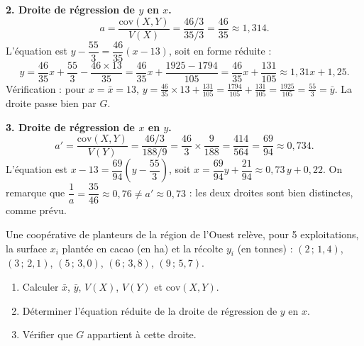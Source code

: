 \documentclass[11pt]{article}
\begin{document}
\begin{exoresolu}
\textbf{2. Droite de régression de $y$ en $x$.}
\[
a=\frac{\mathrm{cov}(X,Y)}{V(X)}=\frac{46/3}{35/3}=\frac{46}{35}\approx 1{,}314.
\]
L'équation est $y-\dfrac{55}{3}=\dfrac{46}{35}(x-13)$, soit en forme réduite :
\[
y=\frac{46}{35}x+\frac{55}{3}-\frac{46\times 13}{35}=\frac{46}{35}x+\frac{1925-1794}{105}=\frac{46}{35}x+\frac{131}{105}\approx 1{,}31x+1{,}25.
\]
Vérification : pour $x=\bar{x}=13$, $y=\frac{46}{35}\times 13+\frac{131}{105}=\frac{1794}{105}+\frac{131}{105}=\frac{1925}{105}=\frac{55}{3}=\bar{y}$. La droite passe bien par $G$.

\textbf{3. Droite de régression de $x$ en $y$.}
\[
a'=\frac{\mathrm{cov}(X,Y)}{V(Y)}=\frac{46/3}{188/9}=\frac{46}{3}\times\frac{9}{188}=\frac{414}{564}=\frac{69}{94}\approx 0{,}734.
\]
L'équation est $x-13=\dfrac{69}{94}\left(y-\dfrac{55}{3}\right)$, soit $x=\dfrac{69}{94}y+\dfrac{21}{94}\approx 0{,}73\,y+0{,}22$.
On remarque que $\dfrac{1}{a}=\dfrac{35}{46}\approx 0{,}76\neq a'\approx 0{,}73$ : les deux droites sont bien distinctes, comme prévu.
\end{exoresolu}

\begin{exercice}
Une coopérative de planteurs de la région de l'Ouest relève, pour 5 exploitations, la surface $x_i$ plantée en cacao (en ha) et la récolte $y_i$ (en tonnes) : $(2\,;\,1{,}4)$, $(3\,;\,2{,}1)$, $(5\,;\,3{,}0)$, $(6\,;\,3{,}8)$, $(9\,;\,5{,}7)$.
\begin{enumerate}
\item Calculer $\bar{x}$, $\bar{y}$, $V(X)$, $V(Y)$ et $\mathrm{cov}(X,Y)$.
\item Déterminer l'équation réduite de la droite de régression de $y$ en $x$.
\item Vérifier que $G$ appartient à cette droite.
\end{enumerate}
\end{exercice}
\end{document}

